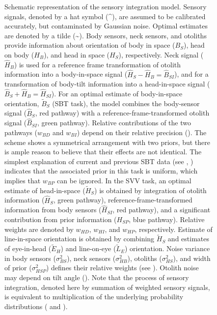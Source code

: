 \begin{figure}
    \caption{Schematic representation of the sensory integration model. Sensory signals, denoted by a hat symbol (\textasciicircum), are assumed to be calibrated accurately, but contaminated by Gaussian noise. Optimal estimates are denoted by a tilde (\textasciitilde). Body sensors, neck sensors, and otoliths provide information about orientation of body in space ($B_S$), head on body ($H_B$), and head in space ($H_S$), respectively. Neck signal ($\hat{H}_B$) is used for a reference frame transformation of otolith information into a body-in-space signal ($\hat{H}_S - \hat{H}_B = \hat{B}_{SI}$), and for a transformation of body-tilt information into a head-in-space signal ($\hat{B}_S + \hat{H}_B = \hat{H}_{SI}$). For an optimal estimate of body-in-space orientation, $\tilde{B}_S$ (SBT task), the model combines the body-sensor signal ($\hat{B}_S$, red pathway) with a reference-frame-transformed otolith signal ($\hat{B}_{SI}$, green pathway). Relative contributions of the two pathways ($w_{BD}$ and $w_{BI}$) depend on their relative precision (). The scheme shows a symmetrical arrangement with two priors, but there is ample reason to believe that their effects are not identical. The simplest explanation of current and previous SBT data (see , ) indicates that the associated prior in this task is uniform, which implies that $w_{BP}$ can be ignored. In the SVV task, an optimal estimate of head-in-space ($\tilde{H}_S$) is obtained by integration of otolith information ($\hat{H}_S$, green pathway), reference-frame-transformed information from body sensors ($\hat{H}_{SI}$, red pathway), and a significant contribution from prior information ($H_{SP}$, blue pathway). Relative weights are denoted by $w_{HD}$, $w_{HI}$, and $w_{HP}$, respectively. Estimate of line-in-space orientation is obtained by combining $\tilde{H}_S$ and estimates of eye-in-head ($\tilde{E}_H$) and line-on-eye ($\tilde{L}_E$) orientation. Noise variance in body sensors ($\sigma^2_{BS}$), neck sensors ($\sigma^2_{HB}$), otoliths ($\sigma^2_{HS}$), and width of prior ($\sigma^2_{HSP}$) defines their relative weights (see ). Otolith noise may depend on tilt angle (). Note that the process of sensory integration, denoted here by summation of weighted sensory signals, is equivalent to multiplication of the underlying probability distributions ( and ).}
    \label{p1:fig1}
\end{figure}

